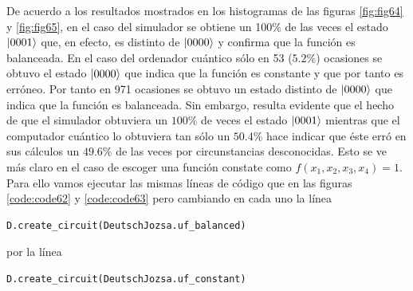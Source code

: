De acuerdo a los resultados mostrados en los histogramas de las figuras \ref{fig:fig64} y \ref{fig:fig65}, en el caso del simulador se obtiene un 100\% de las veces el estado $\left|0001\right\rangle$ que, en efecto, es distinto de $\left|0000\right\rangle$ y confirma que la función es balanceada. En el caso del ordenador cuántico sólo en 53 ($5.2\%$) ocasiones se obtuvo el estado $\left|0000\right\rangle$ que indica que la función es constante y que por tanto es erróneo. Por tanto en 971 ocasiones se obtuvo un estado distinto de $\left|0000\right\rangle$ que indica que la función es balanceada. Sin embargo, resulta evidente que el hecho de que el simulador obtuviera un $100\%$ de veces el estado $\left|0001\right\rangle$ mientras que el computador cuántico lo obtuviera tan sólo un $50.4\%$ hace indicar que éste erró en sus cálculos un $49.6\%$ de las veces por circunstancias desconocidas. Esto se ve más claro en el caso de escoger una función constate como $f(x_1,x_2,x_3,x_4)=1$. Para ello vamos ejecutar las mismas líneas de código que en las figuras \ref{code:code62} y \ref{code:code63} pero cambiando en cada uno la línea
\begin{lstlisting}[language=Python]
D.create_circuit(DeutschJozsa.uf_balanced)
\end{lstlisting}

por la línea
\begin{lstlisting}[language=Python]
D.create_circuit(DeutschJozsa.uf_constant)
\end{lstlisting}

